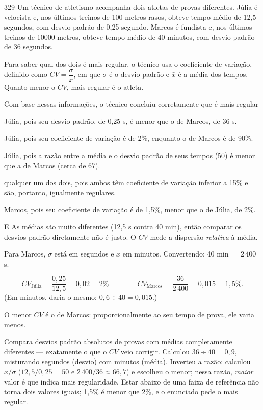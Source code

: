 \begin{questaoinedita}{3}{29}
Um técnico de atletismo acompanha dois atletas de provas diferentes. Júlia é velocista e, nos últimos
treinos de 100 metros rasos, obteve tempo médio de 12,5 segundos, com desvio padrão de 0,25 segundo.
Marcos é fundista e, nos últimos treinos de \num{10000} metros, obteve tempo médio de 40 minutos, com
desvio padrão de 36 segundos.

Para saber qual dos dois é mais regular, o técnico usa o coeficiente de variação, definido como
$CV = \dfrac{\sigma}{\bar{x}}$, em que $\sigma$ é o desvio padrão e $\bar{x}$ é a média dos tempos.
Quanto menor o $CV$, mais regular é o atleta.

Com base nessas informações, o técnico concluiu corretamente que é mais regular
\begin{alternativas}
\item Júlia, pois seu desvio padrão, de 0,25 s, é menor que o de Marcos, de 36 s.
\item Júlia, pois seu coeficiente de variação é de 2\%, enquanto o de Marcos é de 90\%.
\item Júlia, pois a razão entre a média e o desvio padrão de seus tempos (50) é menor que a de Marcos (cerca de 67).
\item qualquer um dos dois, pois ambos têm coeficiente de variação inferior a 15\% e são, portanto, igualmente regulares.
\item Marcos, pois seu coeficiente de variação é de 1,5\%, menor que o de Júlia, de 2\%.
\end{alternativas}
\end{questaoinedita}
\begin{resolucao}{E}
 As médias são muito diferentes (12,5 s contra 40 min), então comparar
os desvios padrão diretamente não é justo. O $CV$ mede a dispersão \emph{relativa} à média.

 Para Marcos, $\sigma$ está em segundos e $\bar{x}$ em minutos. Convertendo:
40 min $= 2\,400$ s.

\[ CV_{\text{Júlia}} = \frac{0{,}25}{12{,}5} = 0{,}02 = 2\% \qquad\qquad CV_{\text{Marcos}} = \frac{36}{2\,400} = 0{,}015 = 1{,}5\%. \]
(Em minutos, daria o mesmo: $0{,}6 \div 40 = 0{,}015$.)

 O menor $CV$ é o de Marcos: proporcionalmente ao seu tempo de prova, ele varia
menos.

\begin{distratores}
 Compara desvios padrão absolutos de provas com médias completamente diferentes — exatamente
o que o $CV$ veio corrigir.
 Calculou $36 \div 40 = 0{,}9$, misturando segundos (desvio) com minutos (média).
 Inverteu a razão: calculou $\bar{x}/\sigma$ ($12{,}5/0{,}25 = 50$ e $2\,400/36 \approx 66{,}7$) e
escolheu o menor; nessa razão, \emph{maior} valor é que indica mais regularidade.
 Estar abaixo de uma faixa de referência não torna dois valores iguais; 1,5\% é menor que 2\%,
e o enunciado pede o mais regular.
\end{distratores}
\end{resolucao}

